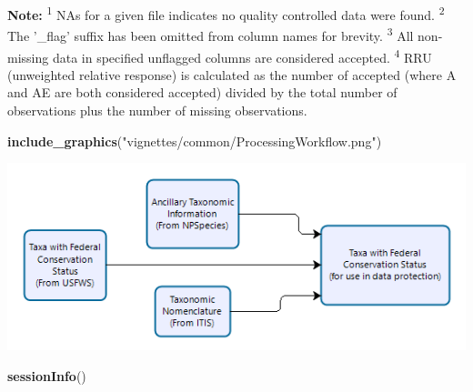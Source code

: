 \documentclass[
]{article}
\newenvironment{Shaded}{\begin{snugshade}}{\end{snugshade}}
\newcommand{\FunctionTok}[1]{\textcolor[rgb]{0.13,0.29,0.53}{\textbf{#1}}}
\newcommand{\NormalTok}[1]{#1}
\newcommand{\StringTok}[1]{\textcolor[rgb]{0.31,0.60,0.02}{#1}}
\begin{document}
\textbf{Note:} \textsuperscript{1} NAs for a given file indicates no
quality controlled data were found. \textsuperscript{2} The '\_flag'
suffix has been omitted from column names for brevity.
\textsuperscript{3} All non-missing data in specified unflagged columns
are considered accepted. \textsuperscript{4} RRU (unweighted relative
response) is calculated as the number of accepted (where A and AE are
both considered accepted) divided by the total number of observations
plus the number of missing observations.

\begin{Shaded}
\begin{Highlighting}[]
\FunctionTok{include\_graphics}\NormalTok{(}\StringTok{"vignettes/common/ProcessingWorkflow.png"}\NormalTok{)}
\end{Highlighting}
\end{Shaded}

\includegraphics[width=7.64in]{vignettes/common/ProcessingWorkflow}

\begin{Shaded}
\begin{Highlighting}[]
\FunctionTok{sessionInfo}\NormalTok{()}
\end{Highlighting}
\end{Shaded}
\end{document}
